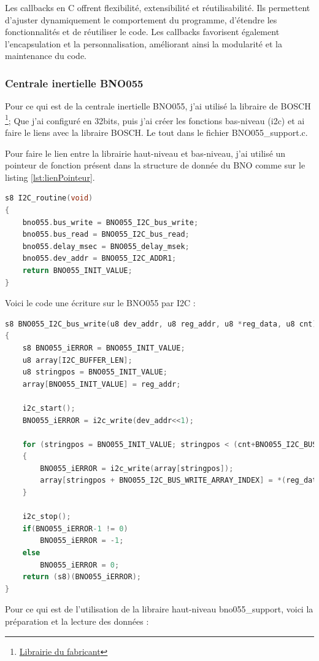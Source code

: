 {{	Les callbacks en C offrent flexibilité, extensibilité et réutilisabilité. Ils permettent d'ajuster dynamiquement le comportement du programme, d'étendre les fonctionnalités et de réutiliser le code. Les callbacks favorisent également l'encapsulation et la personnalisation, améliorant ainsi la modularité et la maintenance du code.	
	}
	
	\clearpage
	\subsubsection{Centrale inertielle BNO055}
	Pour ce qui est de la centrale inertielle BNO055, j'ai utilisé la libraire de BOSCH \footnote{\href{https://github.com/BoschSensortec/BNO055_driver}{Librairie du fabricant}}; Que j'ai configuré en 32bits, puis j'ai créer les fonctions bas-niveau (i2c) et ai faire le liens avec la libraire BOSCH. Le tout dans le fichier BNO055\_support.c.
	
	Pour faire le lien entre la librairie haut-niveau et bas-niveau, j'ai utilisé un pointeur de fonction présent dans la structure de donnée du BNO comme sur le listing \ref{lst:lienPointeur}.
	
\begin{lstlisting}[frame=single, label={lst:lienPointeur}, language=C, caption={Code lien pointeur de fonction}, captionpos=b]
s8 I2C_routine(void)
{
	bno055.bus_write = BNO055_I2C_bus_write;
	bno055.bus_read = BNO055_I2C_bus_read;
	bno055.delay_msec = BNO055_delay_msek;
	bno055.dev_addr = BNO055_I2C_ADDR1;
	return BNO055_INIT_VALUE;
}
\end{lstlisting}

	Voici le code une écriture sur le BNO055 par I2C :
\begin{lstlisting}[frame=single, language=C, caption={Code écriture au BNO055}, captionpos=b, breaklines=true]
s8 BNO055_I2C_bus_write(u8 dev_addr, u8 reg_addr, u8 *reg_data, u8 cnt)
{
	s8 BNO055_iERROR = BNO055_INIT_VALUE;
	u8 array[I2C_BUFFER_LEN];
	u8 stringpos = BNO055_INIT_VALUE;
	array[BNO055_INIT_VALUE] = reg_addr;
	
	i2c_start();
	BNO055_iERROR = i2c_write(dev_addr<<1);
	
	for (stringpos = BNO055_INIT_VALUE; stringpos < (cnt+BNO055_I2C_BUS_WRITE_ARRAY_INDEX); stringpos++)
	{
		BNO055_iERROR = i2c_write(array[stringpos]);
		array[stringpos + BNO055_I2C_BUS_WRITE_ARRAY_INDEX] = *(reg_data + stringpos);
	}
	
	i2c_stop();
	if(BNO055_iERROR-1 != 0)
		BNO055_iERROR = -1;
	else
		BNO055_iERROR = 0;
	return (s8)(BNO055_iERROR);
}
\end{lstlisting}
	Pour ce qui est de l'utilisation de la libraire haut-niveau bno055\_support, voici la préparation et la lecture des données : 
	
}
